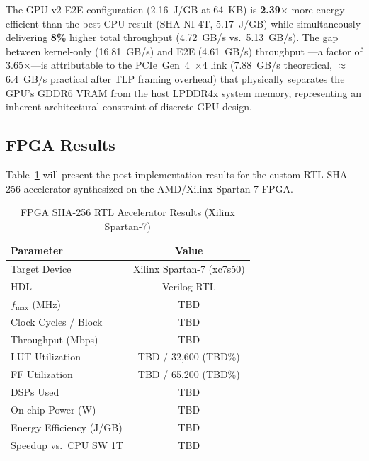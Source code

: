 \documentclass[conference]{IEEEtran}
\begin{document}
The GPU v2 E2E configuration (2.16~J/GB at 64~KB) is \textbf{2.39$\times$}
more energy-efficient than the best CPU result (SHA-NI 4T, 5.17~J/GB)
while simultaneously delivering \textbf{8\%} higher total throughput
(4.72~GB/s vs.\ 5.13~GB/s).
The gap between kernel-only (16.81~GB/s) and E2E (4.61~GB/s) throughput
---a factor of 3.65$\times$---is attributable to the PCIe~Gen~4~$\times$4
link (7.88~GB/s theoretical, $\approx$6.4~GB/s practical after
TLP framing overhead) that physically separates the GPU's GDDR6 VRAM
from the host LPDDR4x system memory, representing an inherent
architectural constraint of discrete GPU design.

\subsection{FPGA Results}


Table~\ref{tab:fpga} will present the post-implementation results for the
custom RTL SHA-256 accelerator synthesized on the AMD/Xilinx Spartan-7 FPGA.

\begin{table}[htbp]
  \caption{FPGA SHA-256 RTL Accelerator Results (Xilinx Spartan-7)}
  \label{tab:fpga}
  \centering
  \begin{tabular}{lc}
    \toprule
    \textbf{Parameter} & \textbf{Value} \\
    \midrule
    Target Device            & Xilinx Spartan-7 (xc7s50) \\
    HDL                      & Verilog RTL \\
    $f_{\max}$ (MHz)         & TBD \\
    Clock Cycles / Block     & TBD \\
    Throughput (Mbps)        & TBD \\
    LUT Utilization          & TBD / 32{,}600 (TBD\%) \\
    FF Utilization           & TBD / 65{,}200 (TBD\%) \\
    DSPs Used                & TBD \\
    On-chip Power (W)        & TBD \\
    Energy Efficiency (J/GB) & TBD \\
    Speedup vs.\ CPU SW 1T   & TBD \\
    \bottomrule
  \end{tabular}
\end{table}
\end{document}

